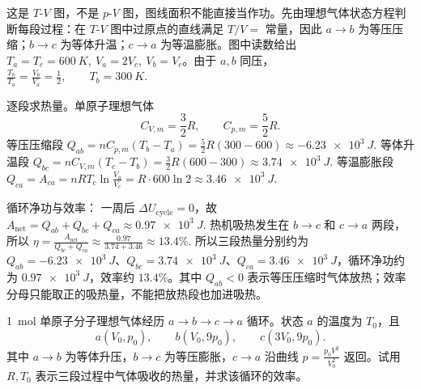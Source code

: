 \documentclass[lang=cn,11pt]{elegantbook}
\begin{document}
\begin{solution}
这是 \(T\)-\(V\) 图，不是 \(p\)-\(V\) 图，图线面积不能直接当作功。先由理想气体状态方程判断每段过程：在 \(T\)-\(V\) 图中过原点的直线满足 \(T/V=\) 常量，因此 \(a\to b\) 为等压压缩；\(b\to c\) 为等体升温；\(c\to a\) 为等温膨胀。图中读数给出 \(T_a=T_c=\SI{600}{K},\ V_a=2V_c,\ V_b=V_c\)。由于 \(a,b\) 同压，
 \(\frac{T_b}{T_a}=\frac{V_b}{V_a}=\frac12, \qquad T_b=\SI{300}{K}.\) 

逐段求热量。单原子理想气体
\[
C_{V,m}=\frac32R,\qquad C_{p,m}=\frac52R.
\]
等压压缩段
 \(Q_{ab}=nC_{p,m}(T_b-T_a) =\frac52R(300-600) \approx \SI{-6.23e3}{J}.\) 
等体升温段
 \(Q_{bc}=nC_{V,m}(T_c-T_b) =\frac32R(600-300) \approx \SI{3.74e3}{J}.\) 
等温膨胀段
 \(Q_{ca}=A_{ca}=nRT_c\ln\frac{V_a}{V_c} =R\cdot600\ln2 \approx \SI{3.46e3}{J}.\) 

循环净功与效率： 一周后 \(\Delta U_{\text{cycle}}=0\)，故
 \(A_{\text{net}}=Q_{ab}+Q_{bc}+Q_{ca} \approx \SI{0.97e3}{J}.\) 
热机吸热发生在 \(b\to c\) 和 \(c\to a\) 两段，所以
 \(\eta=\frac{A_{\text{net}}}{Q_{bc}+Q_{ca}} \approx \frac{0.97}{3.74+3.46} \approx 13.4\%.\) 
所以三段热量分别约为 \(Q_{ab}=-\SI{6.23e3}{J}\)、\(Q_{bc}=\SI{3.74e3}{J}\)、\(Q_{ca}=\SI{3.46e3}{J}\)，循环净功约为 \(\SI{0.97e3}{J}\)，效率约 \(13.4\%\)。其中 \(Q_{ab}<0\) 表示等压压缩时气体放热；效率分母只能取正的吸热量，不能把放热段也加进吸热。
\end{solution}

\begin{exercise}[2015-2016期末：单原子气体沿抛物线回到初态的循环效率]
\SI{1}{mol} 单原子分子理想气体经历 \(a\to b\to c\to a\) 循环。状态 \(a\) 的温度为 \(T_0\)，且
\[
a(V_0,p_0),\qquad b(V_0,9p_0),\qquad c(3V_0,9p_0).
\]
其中 \(a\to b\) 为等体升压，\(b\to c\) 为等压膨胀，\(c\to a\) 沿曲线
 \(p=\frac{p_0V^2}{V_0^2}\) 
返回。试用 \(R,T_0\) 表示三段过程中气体吸收的热量，并求该循环的效率。
\end{exercise}
\end{document}
